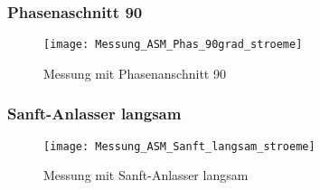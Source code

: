 \newpage
\subsubsection*{Phasenaschnitt 90\textdegree}
\begin{figure}[ht!]
	\centering
	\texttt{[image: Messung\_ASM\_Phas\_90grad\_stroeme]}	
	\caption{Messung mit Phasenanschnitt 90\textdegree}\label{fig:Mess_Phas_90grad_stroeme}
\end{figure}

\newpage
\subsubsection*{Sanft-Anlasser langsam}
\begin{figure}[ht!]
	\centering
	\texttt{[image: Messung\_ASM\_Sanft\_langsam\_stroeme]}	
	\caption{Messung mit Sanft-Anlasser langsam}\label{fig:Mess_Sanft_langsam_stroeme}
\end{figure}




